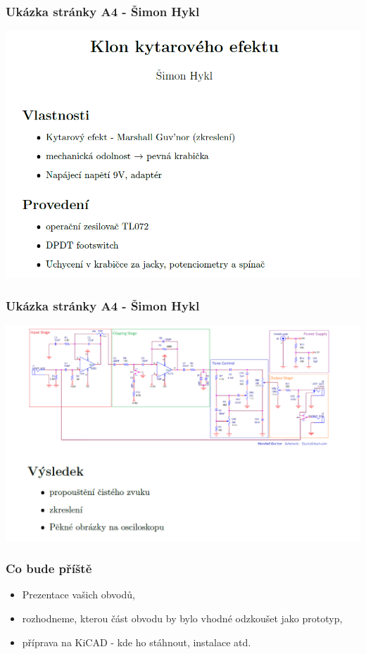 \documentclass{beamer}
\begin{document}
	\begin{frame}
    \frametitle{Ukázka stránky A4 - Šimon Hykl}
		
		\includegraphics[scale=0.5]{obr/A4_Hykl1.png}
	
	\end{frame}
	\begin{frame}
    \frametitle{Ukázka stránky A4 - Šimon Hykl}
		
		\includegraphics[scale=0.5]{obr/A4_Hykl2.png}
	
	\end{frame}
  \begin{frame}
    \frametitle{Co bude příště}
    
    \begin{itemize}
      \item Prezentace vašich obvodů,
			\item rozhodneme, kterou část obvodu by bylo vhodné odzkoušet jako prototyp,
      \item příprava na KiCAD - kde ho stáhnout, instalace atd.
    \end{itemize}
    
  \end{frame}
\end{document}
